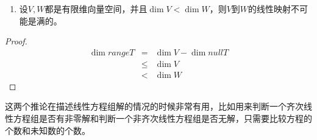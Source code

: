 \documentclass[10pt,a4paper,UTF8]{article}
\begin{document}
\begin{enumerate}
\item 设\(V,W\)都是有限维向量空间，并且\(\dim V < \dim W\)，则\(V\)到\(W\)的线性映射不可能是满的。
\end{enumerate}
\begin{proof}
\begin{eqnarray*}
\dim rangeT & = & \dim V - \dim nullT \\
& \leq & \dim V \\
& < &\dim W
\end{eqnarray*}
\end{proof}

这两个推论在描述线性方程组解的情况的时候非常有用，比如用来判断一个齐次线性方程组是否有非零解和判断一个非齐次线性方程组是否无解，只需要比较方程的个数和未知数的个数。
\end{document}
